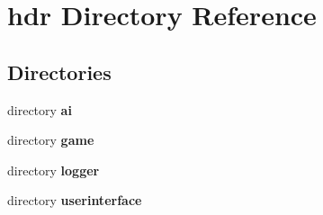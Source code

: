 \section{hdr Directory Reference}
\label{dir_0045f852bf8045b6d5abd9c9eb54a446}
\subsection*{Directories}
\begin{DoxyCompactItemize}
\item 
directory {\bf ai}
\item 
directory {\bf game}
\item 
directory {\bf logger}
\item 
directory {\bf userinterface}
\end{DoxyCompactItemize}
